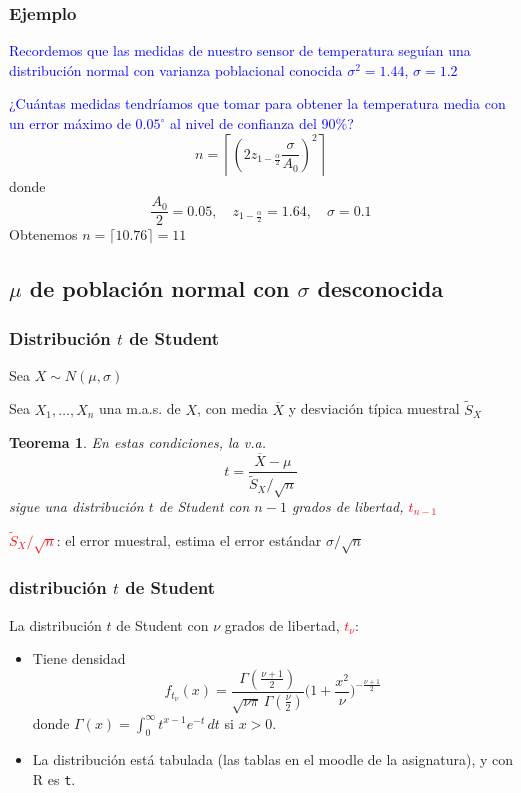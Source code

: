 \documentclass[12pt,t]{beamer}\usepackage[]{graphicx}\usepackage[]{color}
\newcommand{\red}[1]{\textcolor{red}{#1}}
\newcommand{\blue}[1]{\textcolor{blue}{#1}}
\renewcommand{\emph}[1]{{\color{red}#1}}
\theoremstyle{plain}
\newtheorem{teorema}{Teorema}
\theoremstyle{definition}
\begin{document}
\begin{frame}
\frametitle{Ejemplo}

\blue{Recordemos  que las medidas de nuestro sensor  de temperatura seguían una distribución normal con varianza poblacional conocida $\sigma^2=1.44$,  $\sigma=1.2$}
\medskip

\blue{¿Cuántas medidas tendríamos que tomar para obtener la  temperatura media  con un error máximo de $0.05^{\circ}$ al nivel de confianza del 90\%?}
$$
n=\left\lceil \left( 2 z_{1-\frac{\alpha}{2}}\frac{\sigma}{A_0}
\right)^2\right\rceil$$
donde 
$$
\frac{A_0}{2}=0.05,\quad z_{1-\frac{\alpha}{2}}=1.64,\quad \sigma=0.1
$$
Obtenemos $n= \lceil10.76\rceil= 11$
\end{frame}



\subsection{$\mu$ de población normal con $\sigma$ desconocida}

\begin{frame}
\frametitle{Distribución $t$ de Student}


Sea $X\sim N(\mu,\sigma)$
\medskip

Sea $X_1,\ldots,X_n$ una m.a.s. de $X$, con media   $\overline{X}$ y desviación típica muestral $\widetilde{S}_{X}$
\medskip

\begin{teorema}
En estas condiciones, la v.a.
$$
t=\frac{\overline{X}-\mu}{\widetilde{S}_{X}/\sqrt{n}}
$$
sigue una distribución \emph{$t$ de Student} con $n-1$ grados de libertad, \red{$t_{n-1}$}
\end{teorema}
\medskip

\red{$\widetilde{S}_{X}/\sqrt{n}$}: el \emph{error muestral}, estima el error estándar $\sigma/\sqrt{n}$
\end{frame}



\begin{frame}
\frametitle{distribución $t$ de Student}


La distribución $t$ de Student con $\nu$ grados de libertad, \red{$t_{\nu}$}:
\medskip

\begin{itemize}
\item  Tiene  densidad
$$
f_{t_\nu}(x) = \frac{\Gamma(\frac{\nu+1}{2})} {\sqrt{\nu\pi}\,\Gamma(\frac{\nu}{2})} \Big(1+\frac{x^2}{\nu} \Big)^{-\frac{\nu+1}{2}}
$$
donde $\Gamma(x)=\int_{0}^{\infty} t^{x-1}e^{-t}\, dt$ si $x> 0$. 
\bigskip

\item La distribución está tabulada (\emph{las tablas en el moodle de la asignatura}), y con R es \texttt{t}.
\end{itemize}
\end{frame}
\end{document}
